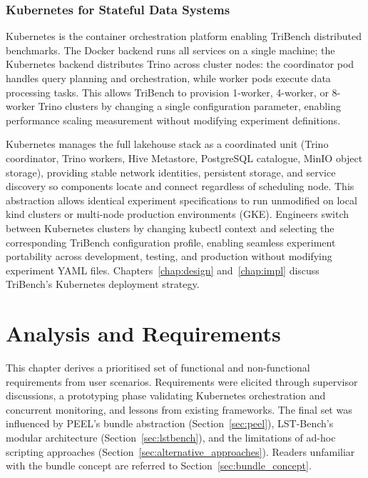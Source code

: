 \documentclass{l4proj}
\begin{document}
\subsection{Kubernetes for Stateful Data Systems}
\label{sec:kubernetes}

Kubernetes is the container orchestration platform enabling TriBench distributed benchmarks. The Docker backend runs all services on a single machine; the Kubernetes backend distributes Trino across cluster nodes: the coordinator pod handles query planning and orchestration, while worker pods execute data processing tasks. This allows TriBench to provision 1-worker, 4-worker, or 8-worker Trino clusters by changing a single configuration parameter, enabling performance scaling measurement without modifying experiment definitions.

Kubernetes manages the full lakehouse stack as a coordinated unit (Trino coordinator, Trino workers, Hive Metastore, PostgreSQL catalogue, MinIO object storage), providing stable network identities, persistent storage, and service discovery so components locate and connect regardless of scheduling node. This abstraction allows identical experiment specifications to run unmodified on local kind clusters or multi-node production environments (GKE). Engineers switch between Kubernetes clusters by changing kubectl context and selecting the corresponding TriBench configuration profile, enabling seamless experiment portability across development, testing, and production without modifying experiment YAML files. Chapters~\ref{chap:design} and~\ref{chap:impl} discuss TriBench's Kubernetes deployment strategy.


\chapter{Analysis and Requirements}
\label{chap:req}

This chapter derives a prioritised set of functional and non-functional requirements from user scenarios. Requirements were elicited through supervisor discussions, a prototyping phase validating Kubernetes orchestration and concurrent monitoring, and lessons from existing frameworks. The final set was influenced by PEEL's bundle abstraction (Section~\ref{sec:peel}), LST-Bench's modular architecture (Section~\ref{sec:lstbench}), and the limitations of ad-hoc scripting approaches (Section~\ref{sec:alternative_approaches}). Readers unfamiliar with the bundle concept are referred to Section~\ref{sec:bundle_concept}.
\end{document}
